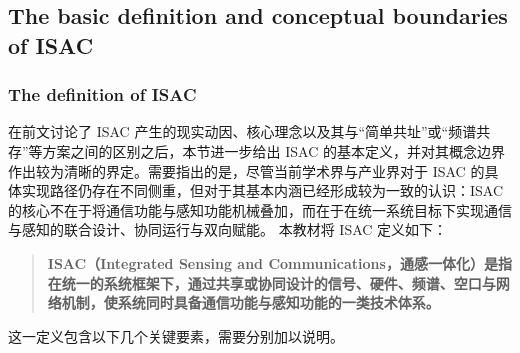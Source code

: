 \subsection{The basic definition and conceptual boundaries of ISAC}
\label{subsec:ch1-basic-definition}
\subsubsection{The definition of ISAC}
\label{subsubsec:ch1-definition-isac}

在前文讨论了 ISAC 产生的现实动因、核心理念以及其与“简单共址”或“频谱共存”等方案之间的区别之后，本节进一步给出 ISAC 的基本定义，并对其概念边界作出较为清晰的界定。需要指出的是，尽管当前学术界与产业界对于 ISAC 的具体实现路径仍存在不同侧重，但对于其基本内涵已经形成较为一致的认识：ISAC 的核心不在于将通信功能与感知功能机械叠加，而在于在统一系统目标下实现通信与感知的联合设计、协同运行与双向赋能\cite{Liu2022ISAC,Liu2020JointRadarComm}。
本教材将 ISAC 定义如下：
\begin{quote}
\textbf{ISAC（Integrated Sensing and Communications，通感一体化）是指在统一的系统框架下，通过共享或协同设计的信号、硬件、频谱、空口与网络机制，使系统同时具备通信功能与感知功能的一类技术体系。}
\end{quote}
这一定义包含以下几个关键要素，需要分别加以说明。
